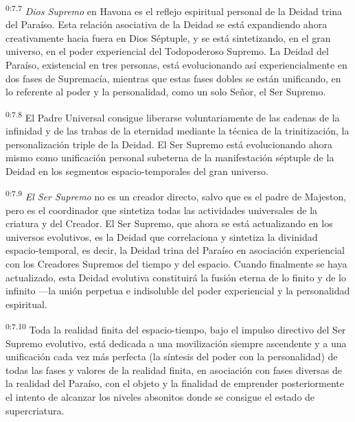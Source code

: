 \par
\textsuperscript{0:7.7} \textit{Dios Supremo} en Havona es el reflejo espiritual personal de la Deidad trina del Paraíso. Esta relación asociativa de la Deidad se está expandiendo ahora creativamente hacia fuera en Dios Séptuple, y se está sintetizando, en el gran universo, en el poder experiencial del Todopoderoso Supremo. La Deidad del Paraíso, existencial en tres personas, está evolucionando así experiencialmente en dos fases de Supremacía, mientras que estas fases dobles se están unificando, en lo referente al poder y la personalidad, como un solo Señor, el Ser Supremo.

\par
\textsuperscript{0:7.8} El Padre Universal consigue liberarse voluntariamente de las cadenas de la infinidad y de las trabas de la eternidad mediante la técnica de la trinitización, la personalización triple de la Deidad. El Ser Supremo está evolucionando ahora mismo como unificación personal subeterna de la manifestación séptuple de la Deidad en los segmentos espacio-temporales del gran universo.

\par
\textsuperscript{0:7.9} \textit{El Ser Supremo} no es un creador directo, salvo que es el padre de Majeston, pero es el coordinador que sintetiza todas las actividades universales de la criatura y del Creador. El Ser Supremo, que ahora se está actualizando en los universos evolutivos, es la Deidad que correlaciona y sintetiza la divinidad espacio-temporal, es decir, la Deidad trina del Paraíso en asociación experiencial con los Creadores Supremos del tiempo y del espacio. Cuando finalmente se haya actualizado, esta Deidad evolutiva constituirá la fusión eterna de lo finito y de lo infinito ---la unión perpetua e indisoluble del poder experiencial y la personalidad espiritual.

\par
\textsuperscript{0:7.10} Toda la realidad finita del espacio-tiempo, bajo el impulso directivo del Ser Supremo evolutivo, está dedicada a una movilización siempre ascendente y a una unificación cada vez más perfecta (la síntesis del poder con la personalidad) de todas las fases y valores de la realidad finita, en asociación con fases diversas de la realidad del Paraíso, con el objeto y la finalidad de emprender posteriormente el intento de alcanzar los niveles absonitos donde se consigue el estado de supercriatura.

